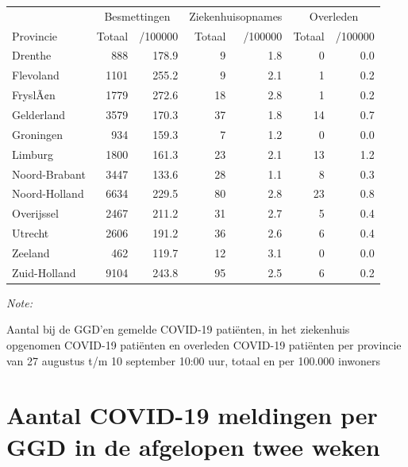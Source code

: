 \documentclass[
  english,
  man,floatsintext]{apa6}
\begin{document}
\begin{table}
\centering
\begin{threeparttable}
\begin{tabular}{lrrrrrr}
\toprule
\multicolumn{1}{c}{ } & \multicolumn{2}{c}{Besmettingen} & \multicolumn{2}{c}{Ziekenhuisopnames} & \multicolumn{2}{c}{Overleden} \\
\cmidrule(l{3pt}r{3pt}){2-3} \cmidrule(l{3pt}r{3pt}){4-5} \cmidrule(l{3pt}r{3pt}){6-7}
Provincie & Totaal & /100000 & Totaal & /100000 & Totaal & /100000\\
\midrule
Drenthe & 888 & 178.9 & 9 & 1.8 & 0 & 0.0\\
Flevoland & 1101 & 255.2 & 9 & 2.1 & 1 & 0.2\\
FryslÃ¢n & 1779 & 272.6 & 18 & 2.8 & 1 & 0.2\\
Gelderland & 3579 & 170.3 & 37 & 1.8 & 14 & 0.7\\
Groningen & 934 & 159.3 & 7 & 1.2 & 0 & 0.0\\
Limburg & 1800 & 161.3 & 23 & 2.1 & 13 & 1.2\\
Noord-Brabant & 3447 & 133.6 & 28 & 1.1 & 8 & 0.3\\
Noord-Holland & 6634 & 229.5 & 80 & 2.8 & 23 & 0.8\\
Overijssel & 2467 & 211.2 & 31 & 2.7 & 5 & 0.4\\
Utrecht & 2606 & 191.2 & 36 & 2.6 & 6 & 0.4\\
Zeeland & 462 & 119.7 & 12 & 3.1 & 0 & 0.0\\
Zuid-Holland & 9104 & 243.8 & 95 & 2.5 & 6 & 0.2\\
\bottomrule
\end{tabular}
\begin{tablenotes}
\item \textit{Note: } 
\item Aantal bij de GGD’en gemelde COVID-19 patiënten, in het ziekenhuis opgenomen COVID-19 patiënten en overleden COVID-19 patiënten per provincie van 27 augustus t/m 10 september 10:00 uur, totaal en per 100.000 inwoners
\end{tablenotes}
\end{threeparttable}
\end{table}

\newpage

\hypertarget{aantal-covid-19-meldingen-per-ggd-in-de-afgelopen-twee-weken}{%
\section{Aantal COVID-19 meldingen per GGD in de afgelopen twee weken}\label{aantal-covid-19-meldingen-per-ggd-in-de-afgelopen-twee-weken}}
\end{document}
